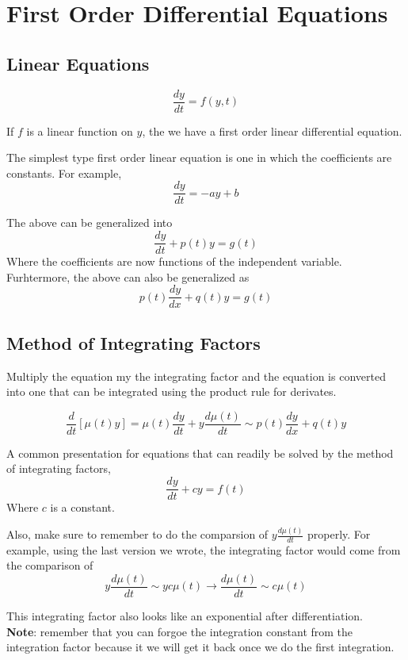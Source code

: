 \section{First Order Differential Equations}

\subsection{Linear Equations}

$$
\frac{dy}{dt} = f(y,t)
$$

If $f$ is a linear function on $y$, the we have a first order linear differential equation.

The simplest type first order linear equation is one in which the coefficients are constants.
For example,
$$
\frac{dy}{dt} = -ay + b
$$

The above can be generalized into
$$
\frac{dy}{dt} + p(t) y = g(t)
$$
Where the coefficients are now functions of the independent variable.
Furhtermore, the above can also be generalized as
$$
p(t) \frac{dy}{dx} + q(t)y = g(t)
$$

\subsection{Method of Integrating Factors}

Multiply the equation my the integrating factor and the equation is converted into one that can
be integrated using the product rule for derivates.


$$
\frac{d}{dt} \left[ \mu(t)y \right] =
\mu(t) \frac{dy}{dt} + y \frac{d\mu(t)}{dt} \sim p(t) \frac{dy}{dx} + q(t)y
$$

A common presentation for equations
that can readily be solved by the method of integrating factors,
$$
\frac{dy}{dt} + cy = f(t)
$$
Where $c$ is a constant.

Also, make sure to remember to do the comparsion of $y \frac{d\mu(t)}{dt}$ properly.
For example, using the last version we wrote, the integrating factor would come from the comparison of
$$
y \frac{d\mu(t)}{dt} \sim y c\mu(t) \rightarrow \frac{d\mu(t)}{dt} \sim c\mu(t)
$$

This integrating factor also looks like an exponential after differentiation.
\\

\textbf{Note}: remember that you can forgoe the integration constant from the integration factor because
it we will get it back once we do the first integration.


